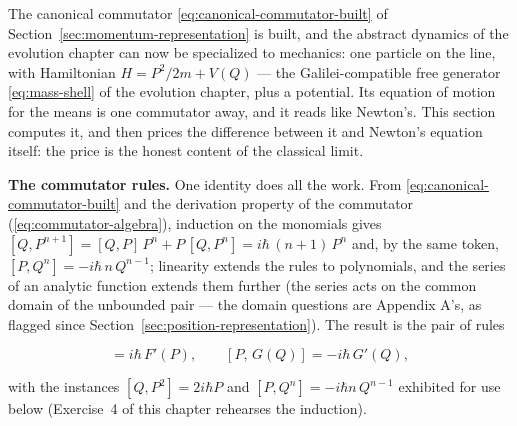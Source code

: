 The canonical commutator \eqref{eq:canonical-commutator-built} of Section~\ref{sec:momentum-representation} is built, and the abstract dynamics of the evolution chapter can now be specialized to mechanics: one particle on the line, with Hamiltonian $H = P^2/2m + V(Q)$ --- the Galilei-compatible free generator \eqref{eq:mass-shell} of the evolution chapter, plus a potential. Its equation of motion for the means is one commutator away, and it reads like Newton's. This section computes it, and then prices the difference between it and Newton's equation itself: the price is the honest content of the classical limit.

\textbf{The commutator rules.} One identity does all the work. From \eqref{eq:canonical-commutator-built} and the derivation property of the commutator (\eqref{eq:commutator-algebra}), induction on the monomials gives $[Q,P^{n+1}] = [Q,P]\,P^n + P\,[Q,P^n] = i\hbar\,(n+1)\,P^n$ and, by the same token, $[P,Q^n] = -i\hbar\,n\,Q^{n-1}$; linearity extends the rules to polynomials, and the series of an analytic function extends them further (the series acts on the common domain of the unbounded pair --- the domain questions are Appendix A's, as flagged since Section~\ref{sec:position-representation}). The result is the pair of rules
\begin{linenomath}
    \begin{equation}
        [Q,\,F(P)] = i\hbar\,F'(P),
        \qquad
        [P,\,G(Q)] = -i\hbar\,G'(Q),
        \label{eq:qp-commutator-rules}
    \end{equation}
\end{linenomath}
with the instances $[Q,P^2] = 2i\hbar P$ and $[P,Q^n] = -i\hbar n\,Q^{n-1}$ exhibited for use below (Exercise~4 of this chapter rehearses the induction).

